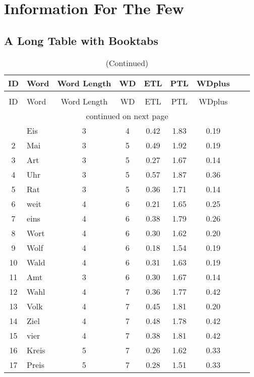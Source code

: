 \chapter{Information For The Few}



\section{A Long Table with Booktabs}


{\scriptsize
\begin{longtable}{clccccccc}
\caption[wordlist]{A sample list of words.}\\
\toprule
ID & Word & Word Length & WD & ETL & PTL &  WDplus \\
\midrule
\endfirsthead
\caption[]{(Continued)}\\
\toprule
ID & Word & Word Length & WD & ETL & PTL &  WDplus \\
\midrule
\endhead
\midrule
\multicolumn{9}{c}{continued on next page}\\
\bottomrule
\endfoot
\endlastfoot
\hline
1 & Eis & 3 & 4 & 0.42 & 1.83 & 0.19 \\ \hline
2 & Mai & 3 & 5 & 0.49 & 1.92 & 0.19 \\ \hline
3 & Art & 3 & 5 & 0.27 & 1.67 & 0.14 \\ \hline
4 & Uhr & 3 & 5 & 0.57 & 1.87 & 0.36 \\ \hline
5 & Rat & 3 & 5 & 0.36 & 1.71 & 0.14 \\ \hline
6 & weit & 4 & 6 & 0.21 & 1.65 & 0.25 \\ \hline
7 & eins & 4 & 6 & 0.38 & 1.79 & 0.26 \\ \hline
8 & Wort & 4 & 6 & 0.30 & 1.62 & 0.20 \\ \hline
9 & Wolf & 4 & 6 & 0.18 & 1.54 & 0.19 \\ \hline
10 & Wald & 4 & 6 & 0.31 & 1.63 & 0.19 \\ \hline
11 & Amt & 3 & 6 & 0.30 & 1.67 & 0.14 \\ \hline
12 & Wahl & 4 & 7 & 0.36 & 1.77 & 0.42 \\ \hline
13 & Volk & 4 & 7 & 0.45 & 1.81 & 0.20 \\ \hline
14 & Ziel & 4 & 7 & 0.48 & 1.78 & 0.42 \\ \hline
15 & vier & 4 & 7 & 0.38 & 1.81 & 0.42 \\ \hline
16 & Kreis & 5 & 7 & 0.26 & 1.62 & 0.33 \\ \hline
17 & Preis & 5 & 7 & 0.28 & 1.51 & 0.33 \\ \hline

\end{longtable}}
